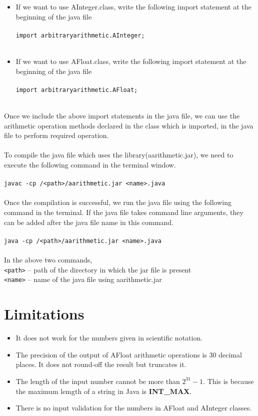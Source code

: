 \documentclass[a4paper,12pt]{article}
\begin{document}
\begin{itemize}
    \item If we want to use AInteger.class, write the following import statement at the beginning of the java file\\\\
    \texttt{import arbitraryarithmetic.AInteger;}\\\\

    \item If we want to use AFloat.class, write the following import statement at the beginning of the java file\\\\
    \texttt{import arbitraryarithmetic.AFloat;}\\\\
\end{itemize}
Once we include the above import statements in the java file, we can use the arithmetic operation methods declared in the class which is imported, in the java file to perform required operation.\\\\
To compile the java file which uses the library(aarithmetic.jar), we need to execute the following command in the terminal window.\\\\
\texttt{javac -cp /<path>/aarithmetic.jar <name>.java}\\\\
Once the compilation is successful, we run the java file using the following command in the terminal. If the java file takes command line arguments, they can be added after the java file name in this command.\\\\
\texttt{java -cp /<path>/aarithmetic.jar <name>.java}\\\\
In the above two commands,\\
\texttt{<path>} -- path of the directory in which the jar file is present\\
\texttt{<name>} -- name of the java file using aarithmetic.jar

\section{Limitations}
\begin{itemize}
    \item It does not work for the numbers given in scientific notation.
    \item The precision of the output of AFloat arithmetic operations is 30 decimal places. It does not round-off the result but truncates it.
    \item The length of the input number cannot be more than $2^{31} -1$. This is because the maximum lemgth of a string in Java is \textbf{INT\_MAX}.
    \item There is no input validation for the numbers in AFloat and AInteger classes.
\end{itemize}
\end{document}
